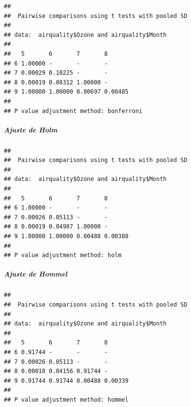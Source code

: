 \documentclass[]{article}
\newenvironment{Shaded}{\begin{snugshade}}{\end{snugshade}}
\newcommand{\KeywordTok}[1]{\textcolor[rgb]{0.13,0.29,0.53}{\textbf{#1}}}
\newcommand{\DataTypeTok}[1]{\textcolor[rgb]{0.13,0.29,0.53}{#1}}
\newcommand{\StringTok}[1]{\textcolor[rgb]{0.31,0.60,0.02}{#1}}
\newcommand{\OperatorTok}[1]{\textcolor[rgb]{0.81,0.36,0.00}{\textbf{#1}}}
\newcommand{\NormalTok}[1]{#1}
\let\oldsubparagraph\subparagraph
\renewcommand{\subparagraph}[1]{\oldsubparagraph{#1}\mbox{}}
\begin{document}
\begin{verbatim}
## 
##  Pairwise comparisons using t tests with pooled SD 
## 
## data:  airquality$Ozone and airquality$Month 
## 
##   5       6       7       8      
## 6 1.00000 -       -       -      
## 7 0.00029 0.10225 -       -      
## 8 0.00019 0.08312 1.00000 -      
## 9 1.00000 1.00000 0.00697 0.00485
## 
## P value adjustment method: bonferroni
\end{verbatim}

\subparagraph{Ajuste de Holm}\label{ajuste-de-holm}

\begin{Shaded}
\end{Shaded}

\begin{verbatim}
## 
##  Pairwise comparisons using t tests with pooled SD 
## 
## data:  airquality$Ozone and airquality$Month 
## 
##   5       6       7       8      
## 6 1.00000 -       -       -      
## 7 0.00026 0.05113 -       -      
## 8 0.00019 0.04987 1.00000 -      
## 9 1.00000 1.00000 0.00488 0.00388
## 
## P value adjustment method: holm
\end{verbatim}

\subparagraph{Ajuste de Hommel}\label{ajuste-de-hommel}

\begin{Shaded}
\end{Shaded}

\begin{verbatim}
## 
##  Pairwise comparisons using t tests with pooled SD 
## 
## data:  airquality$Ozone and airquality$Month 
## 
##   5       6       7       8      
## 6 0.91744 -       -       -      
## 7 0.00026 0.05113 -       -      
## 8 0.00018 0.04156 0.91744 -      
## 9 0.91744 0.91744 0.00488 0.00339
## 
## P value adjustment method: hommel
\end{verbatim}
\end{document}
